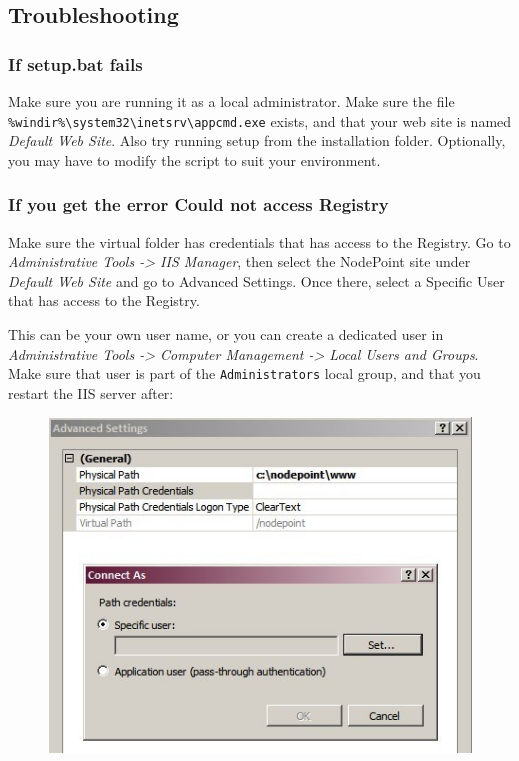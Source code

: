\documentclass[11pt]{article}
\begin{document}
\subsection{Troubleshooting}

{
\subsubsection{If setup.bat fails}

Make sure you are running it as a local administrator. Make sure the file \texttt{\%windir\%\textbackslash system32\textbackslash inetsrv\textbackslash appcmd.exe} exists, and that your web site is named \textit{Default Web Site}. Also try running setup from the installation folder. Optionally, you may have to modify the script to suit your environment.

\subsubsection{If you get the error Could not access Registry}

Make sure the virtual folder has credentials that has access to the Registry. Go to \textit{Administrative Tools -> IIS Manager}, then select the NodePoint site under \textit{Default Web Site} and go to Advanced Settings. Once there, select a Specific User that has access to the Registry.

This can be your own user name, or you can create a dedicated user in \textit{Administrative Tools -> Computer Management -> Local Users and Groups}. Make sure that user is part of the \texttt{Administrators} local group, and that you restart the IIS server after:

\begin{figure}[h]
\includegraphics{iisaccount.jpg}
\end{figure}

}
\end{document}
